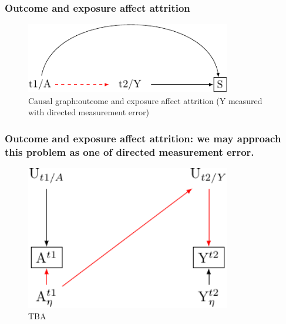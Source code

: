 \documentclass[
  singlecolumn]{report}
\begin{document}
\hypertarget{outcome-and-exposure-affect-attrition}{%
\subsubsection{Outcome and exposure affect
attrition}\label{outcome-and-exposure-affect-attrition}}

\begin{figure}

{\centering \includegraphics[width=0.8\textwidth,height=\textheight]{causal-dags_files/figure-pdf/fig-dag-8-5-1.pdf}

}

\caption{\label{fig-dag-8-5}Causal graph:outcome and exposure affect
attrition (Y measured with directed measurement error)}

\end{figure}

\hypertarget{outcome-and-exposure-affect-attrition-we-may-approach-this-problem-as-one-of-directed-measurement-error.}{%
\subsubsection{Outcome and exposure affect attrition: we may approach
this problem as one of directed measurement
error.}\label{outcome-and-exposure-affect-attrition-we-may-approach-this-problem-as-one-of-directed-measurement-error.}}

\begin{figure}

{\centering \includegraphics[width=0.8\textwidth,height=\textheight]{causal-dags_files/figure-pdf/fig-directed-measurement-error-1.pdf}

}

\caption{\label{fig-directed-measurement-error}TBA}

\end{figure}
\end{document}
